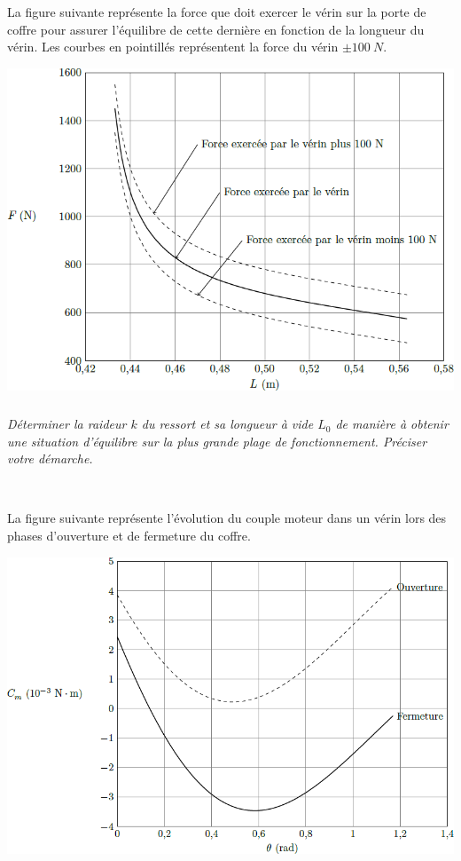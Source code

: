 \documentclass[10pt,fleqn]{article} %
\begin{document}
\begin{multicols}{2}
\begin{multicols}{2}
La figure suivante représente la force que doit exercer le vérin sur la porte de coffre pour assurer
l’équilibre de cette dernière en fonction de la longueur du vérin. Les courbes en pointillés représentent la force du vérin $\pm\SI{100}{N}$.


\begin{center}
\includegraphics[width=\linewidth]{images/fig_03}
\end{center}



\subparagraph{}
\textit{Déterminer la raideur $k$ du ressort et sa longueur à vide $L_0$ de manière à obtenir une situation d’équilibre
sur la plus grande plage de fonctionnement. Préciser votre démarche.}
\ifprof
\begin{corrige}~\\

\end{corrige}
\else
\fi

La figure suivante représente l’évolution du couple moteur dans un vérin lors des phases d’ouverture et de fermeture
du coffre.


\begin{center}
\includegraphics[width=\linewidth]{images/fig_04}
\end{center}


\end{multicols}
\end{multicols}
\end{document}
